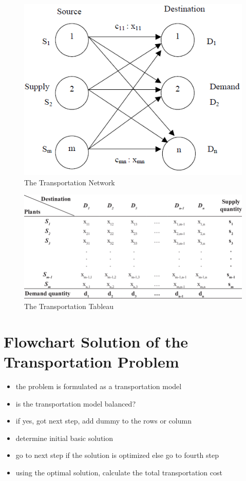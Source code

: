 \documentclass[12pt]{report}
\newcommand{\tp}{Transportation Problem }
\begin{document}
	\begin{figure}[!h]
		\centering
		\includegraphics[width=0.46\linewidth]{tt}
		\caption{The Transportation Network}
		\label{fg:3_1}
	\end{figure}
	\begin{figure}[!h]
		\centering
		\includegraphics[width=0.65\linewidth]{tt1}
		\caption{The Transportation Tableau}
		\label{fg:3_2}
	\end{figure}
	
	\section{Flowchart Solution of the \tp}
	\begin{itemize}
		\item the problem is formulated as a transportation model
		\item is the transportation model balanced?
		\item if yes, got next step, add dummy to the rows or column
		\item determine initial basic solution
		\item go to next step if the solution is optimized else go to fourth step
		\item using the optimal solution, calculate the total transportation cost
	\end{itemize}
	
\end{document}
